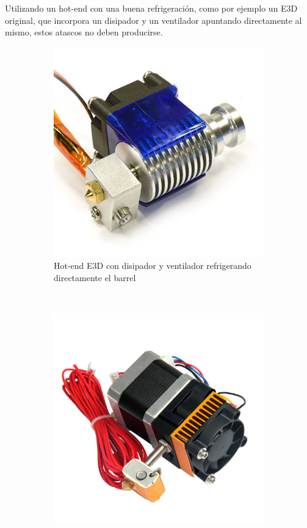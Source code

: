 \documentclass[11pt,a4paper]{article}
\begin{document}
Utilizando un hot-end con una buena refrigeración, como por ejemplo un E3D original, que incorpora un disipador y un ventilador apuntando directamente al mismo, estos atascos no deben producirse.\begin{figure}[H]
    \centering
    \begin{subfigure}[b]{0.4\textwidth}
        \includegraphics[width=\textwidth,cfbox=azul_marcos 4pt 0pt]{FOTOS/E3D_GOOD_COOLING}
		\caption*{Hot-end E3D con disipador y ventilador refrigerando directamente el barrel}
    \end{subfigure}
    ~ \qquad%
    \begin{subfigure}[b]{0.4\textwidth}
        \includegraphics[width=\textwidth,cfbox=azul_marcos 4pt 0pt]{FOTOS/MK8_BAD_COOLING}

\end{subfigure}
\end{figure}
\end{document}
